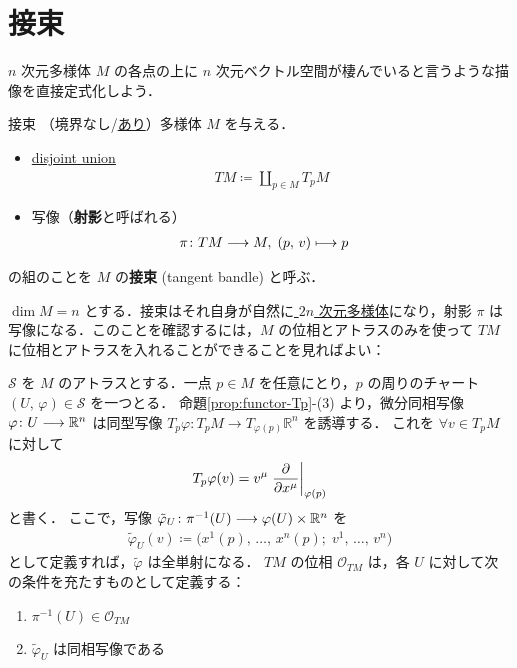 \documentclass[geometry_main]{subfiles}
\begin{document}

\section{接束}

$n$ 次元\cinfty 多様体 $M$ の各点の上に $n$ 次元ベクトル空間が棲んでいると言うような描像を直接定式化しよう．

\begin{mydef}[label=def:bundle-tangent]{接束} 
	（境界なし/\hyperref[def:mani-with-boundary]{あり}）\cinfty 多様体 $M$ を与える．
	\begin{itemize}
		\item \hyperref[def:sum-sets]{disjoint union}
		\begin{align} 
			TM \coloneqq \coprod_{p \in M} T_pM
		\end{align}
		\item 写像（\textbf{射影}と呼ばれる）
		\begin{align} 
			&\pi \colon TM \longrightarrow M,\; (p,\, v) \longmapsto p
		\end{align}
	\end{itemize}
	の組のことを $M$ の\textbf{接束} (tangent bandle) と呼ぶ．
\end{mydef}

$\dim M = n$ とする．接束はそれ自身が自然に\underline{ $2n$ 次元\cinfty 多様体}になり，射影 $\pi$ は \cinfty 写像になる．このことを確認するには，$M$ の位相と\cinfty アトラスのみを使って $TM$ に位相と\cinfty アトラスを入れることができることを見ればよい：

$\mathcal{S}$ を $M$ のアトラスとする．一点 $p \in M$ を任意にとり，$p$ の周りのチャート $(U,\, \varphi) \in \mathcal{S}$ を一つとる．
命題\ref{prop:functor-Tp}-(3) より，微分同相写像 $\varphi \colon U \longrightarrow \mathbb{R}^n$ は同型写像 $T_p \varphi \colon T_p M \to T_{\varphi(p)} \mathbb{R}^n$ を誘導する．
これを $\forall v \in T_p M$ に対して
\begin{align} 
	T_p \varphi (v) = v^\mu \eval{\pdv{}{x^\mu}}_{\varphi(p)}
\end{align}
と書く．
ここで，写像 $\tilde{\varphi}_U \colon \pi^{-1}(U) \longrightarrow \varphi(U) \times \mathbb{R}^n$ を
\begin{align} 
	\tilde{\varphi}_U(v) \coloneqq \bigl( x^1(p),\, \dots ,\, x^n(p);\; v^1,\, \dots ,\, v^n \bigr)
\end{align}
として定義すれば，$\tilde{\varphi}$ は全単射になる． 
$TM$ の位相 $\mathscr{O}_{TM}$ は，各 $U$ に対して次の条件を充たすものとして定義する：
\begin{enumerate} 
	\item $\pi^{-1}(U) \in \mathscr{O}_{TM}$ 
	\item $\tilde{\varphi}_U$ は同相写像である
\end{enumerate}
\end{document}
